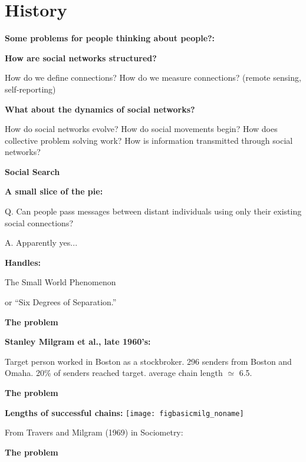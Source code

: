 \section{History}

  \textbf{Some problems for people thinking about people?:}
  
  \textbf{How are social networks structured?}
    
     How do we define connections?
     How do we measure connections?
     (remote sensing, self-reporting)
    
  

  \textbf{What about the dynamics of social networks?}
    
     How do social networks evolve? 
     How do social movements begin? 
     How does collective problem solving work? 
     How is information transmitted through social networks?
    
  


  \textbf{Social Search}

  \textbf{A small slice of the pie:}
    
     
      \alert{Q.} Can people pass messages between distant individuals 
      using only their existing social connections?
    
      \alert{A.} Apparently yes...
    
  

  \textbf{Handles:}
    
     
      The Small World Phenomenon
    
      or ``Six Degrees of Separation.''
    
  


  \textbf{The problem}

  \textbf{Stanley Milgram et al., late 1960's:}
    
     Target person worked in Boston as a stockbroker.
     296 senders from Boston and Omaha.
     20\% of senders reached target.
     average chain length $\simeq$ 6.5.
    
  


   \textbf{The problem}

        
     \textbf{Lengths of successful chains:}
       \texttt{[image: figbasicmilg\_noname]}
     
     
     From Travers and Milgram (1969) in Sociometry:\cite{travers1969a}\\
   

  \textbf{The problem}

